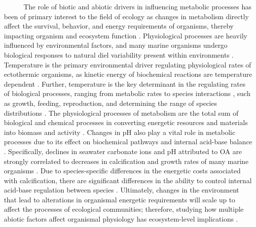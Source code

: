 \documentclass[
]{article}
\begin{document}
~~~~~ The role of biotic and abiotic drivers in influencing metabolic
processes has been of primary interest to the field of ecology as
changes in metabolism directly affect the survival, behavior, and energy
requirements of organisms, thereby impacting organism and ecosystem
function \citep{carey2016sea}. Physiological processes are heavily
influenced by environmental factors, and many marine organisms undergo
biological responses to natural diel variability present within
environments \citep{hofmann2010living}. Temperature is the primary
environmental driver regulating physiological rates of ectothermic
organisms, as kinetic energy of biochemical reactions are temperature
dependent
\citep{levins1968evolution, huey1979integrating, hochachka2002biochemical}.
Further, temperature is the key determinant in the regulating rates of
biological processes, ranging from metabolic rates
\citep{gillooly2001effects} to species interactions
\citep{sanford1999regulation}, such as growth, feeding, reproduction,
and determining the range of species distributions
\citep{kordas2011community, sanford2002feeding, pinsky2013marine}. The
physiological processes of metabolism are the total sum of biological
and chemical processes in converting energetic resources and materials
into biomass and activity \citep{brown2004metabolic}. Changes in pH also
play a vital role in metabolic processes due to its effect on
biochemical pathways and internal acid-base balance
\citep{gaylord2015ocean}. Specifically, declines in seawater carbonate
ions and pH attributed to OA are strongly correlated to decreases in
calcification and growth rates of many marine organisms
\citep{kroeker2013impacts}. Due to species-specific differences in the
energetic costs associated with calcification, there are significant
differences in the ability to control internal acid-base regulation
between species \citep{doney2009ocean}. Ultimately, changes in the
environment that lead to alterations in organismal energetic
requirements will scale up to affect the processes of ecological
communities; therefore, studying how multiple abiotic factors affect
organismal physiology has ecosystem-level implications
\citep{tomanek2002heat, barclay2019variation, kroeker2022ecological}.
\end{document}

